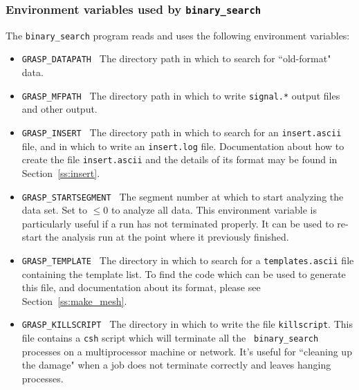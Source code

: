 \subsubsection{Environment variables used by {\tt binary\_search}}
The {\tt binary\_search} program reads and uses the following environment variables:
\begin{itemize}
\item
{\tt GRASP\_DATAPATH }
The directory path in which to search for ``old-format" data.
\item
{\tt GRASP\_MFPATH }
The directory path in which to write {\tt signal.*} output files
and other output.
\item
{\tt GRASP\_INSERT }
The directory path in which to search for an {\tt insert.ascii} file,
and in which to write an {\tt insert.log} file.  Documentation about how
to create the file {\tt insert.ascii} and the details of its format may
be found in Section~\ref{ss:insert}.
\item
{\tt GRASP\_STARTSEGMENT }
The segment number at which to start analyzing the data set.  Set to
$\le 0$ to analyze all data.  This environment variable is particularly
useful if a run has not terminated properly.  It can be used to re-start
the analysis run at the point where it previously finished.
\item
{\tt GRASP\_TEMPLATE }
The directory in which to search for a {\tt templates.ascii} file
containing the template list.  To find the code which can be used to
generate this file, and documentation about its format, please see
Section~\ref{ss:make_mesh}.
\item
{\tt GRASP\_KILLSCRIPT }
The directory in which to write the file {\tt killscript}.  This
file contains a {\tt csh} script which will terminate all the {\tt
binary\_search} processes on a multiprocessor machine or network.
It's useful for ``cleaning up the damage" when a job does not terminate
correctly and leaves hanging processes.
\end{itemize}
\clearpage


